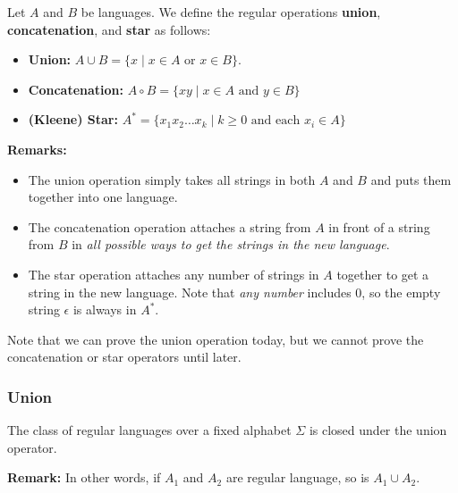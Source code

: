 \documentclass[letterpaper]{article}
\begin{document}
\begin{definition}{}{}
    Let $A$ and $B$ be languages. We define the regular operations \textbf{union}, \textbf{concatenation}, and \textbf{star} as follows: 
    \begin{itemize}
        \item \textbf{Union:} $A \cup B = \{x \mid x \in A \text{ or } x \in B\}$.
        \item \textbf{Concatenation:} $A \circ B = \{xy \mid x \in A \text{ and } y \in B\}$
        \item \textbf{(Kleene) Star:} $A^* = \{x_1 x_2 \dots x_k \mid k \geq 0 \text{ and each } x_i \in A\}$
    \end{itemize}
\end{definition}
\textbf{Remarks:}
\begin{itemize}
    \item The union operation simply takes all strings in both $A$ and $B$ and puts them together into one language.
    \item The concatenation operation attaches a string from $A$ in front of a string from $B$ in \emph{all possible ways to get the strings in the new language}.
    \item The star operation attaches any number of strings in $A$ together to get a string in the new language. Note that \emph{any number} includes 0, so the empty string $\epsilon$ is always in $A^*$.
\end{itemize}
Note that we can prove the union operation today, but we cannot prove the concatenation or star operators until later.

\subsubsection{Union}
\begin{theorem}{}{}
    The class of regular languages over a fixed alphabet $\Sigma$ is closed under the union operator. 
\end{theorem}
\textbf{Remark:} In other words, if $A_1$ and $A_2$ are regular language, so is $A_1 \cup A_2$.

\bigskip 
\end{document}
